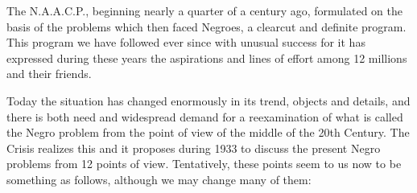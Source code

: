 \documentclass[letterpaper,10pt,english]{jupyterBook}
\begin{document}
\sphinxAtStartPar
The N.A.A.C.P., beginning nearly a quarter of a century ago, formulated on the basis of the problems which then faced Negroes, a clear\sphinxhyphen{}cut and definite program. This program we have followed ever since with unusual success for it has expressed during these years the aspirations and lines of effort among 12 millions and their friends.

\sphinxAtStartPar
Today the situation has changed enormously in its trend, objects and details, and there is both need and widespread demand for a re\sphinxhyphen{}examination of what is called the Negro problem from the point of view of the middle of the 20th Century. The Crisis realizes this and it proposes during 1933 to discuss the present Negro problems from 12 points of view. Tentatively, these points seem to us now to be something as follows, although we may change many of them:
\end{document}
